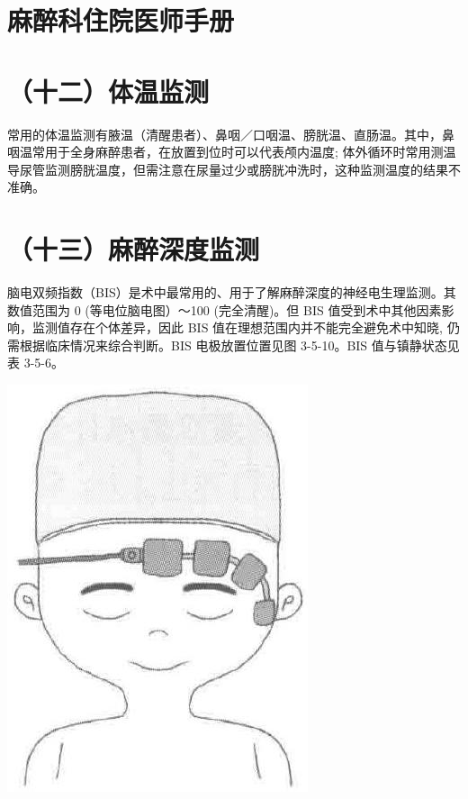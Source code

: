\documentclass[10pt]{article}
\begin{document}
\section*{麻醉科住院医师手册}
\section*{（十二）体温监测}
常用的体温监测有腋温（清醒患者）、鼻咽／口咽温、膀胱温、直肠温。其中，鼻咽温常用于全身麻醉患者，在放置到位时可以代表颅内温度; 体外循环时常用测温导尿管监测膀胱温度，但需注意在尿量过少或膀胱冲洗时，这种监测温度的结果不准确。

\section*{（十三）麻醉深度监测}
脑电双频指数（BIS）是术中最常用的、用于了解麻醉深度的神经电生理监测。其数值范围为 0 (等电位脑电图）～100 (完全清醒)。但 BIS 值受到术中其他因素影响，监测值存在个体差异，因此 BIS 值在理想范围内并不能完全避免术中知晓, 仍需根据临床情况来综合判断。BIS 电极放置位置见图 3-5-10。BIS 值与镇静状态见表 3-5-6。

\begin{center}
\includegraphics[max width=\textwidth]{2024_07_05_645bb794a4d4f32ee0c8g-108}
\end{center}
\end{document}
